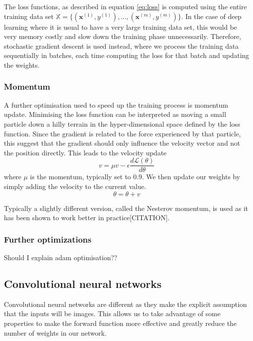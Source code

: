 \documentclass[12pt,a4paper,twoside,openright]{report}
\begin{document}
The loss functions, as described in equation \ref{eq:loss} is computed using the entire training data set $\mathbb{X} = \{(\mathbf{x}^{(1)},y^{(1)}), ...,(\mathbf{x}^{(m)},y^{(m)})\}$. In the case of deep learning where it is usual to have a very large training data set, this would be very memory costly and slow down the training phase unnecessarily. Therefore, stochastic gradient descent is used instead, where we process the training data sequentially in batches, each time computing the loss for that batch and updating the weights.

\subsubsection{Momentum}
A further optimisation used to speed up the training process is momentum update. Minimising the loss function can be interpreted as moving a small particle down a hilly terrain in the hyper-dimensional space defined by the loss function. Since the gradient is related to the force experienced by that particle, this suggest that the gradient should only influence the velocity vector and not the position directly. This leads to the velocity update
\begin{equation}
	v = \mu  v - \epsilon \frac{d\mathcal{L}(\theta)}{d\theta}
\end{equation}
where $\mu$ is the momentum, typically set to 0.9. We then update our weights by simply adding the velocity to the current value.
\begin{equation}
	\theta = \theta + v
\end{equation}

Typically a slightly different version, called the Nesterov momentum, is used as it has been shown to work better in practice[CITATION].

\subsubsection{Further optimizations}
Should I explain adam optimisation??

\subsection{Convolutional neural networks}
Convolutional neural networks are different as they make the explicit assumption that the inputs will be images. This allows us to take advantage of some properties to make the forward function more effective and greatly reduce the number of weights in our network. 
\end{document}
